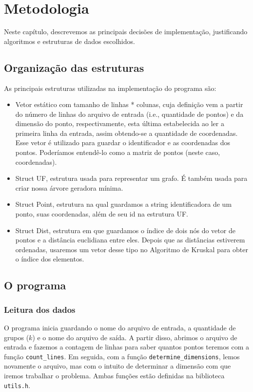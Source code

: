 \chapter{Metodologia}\label{cap-metodologia}

Neste capítulo, descrevemos as principais decisões de implementação, justificando algoritmos e estruturas de dados escolhidos.

\section{Organização das estruturas}\label{sec-organizacao}
As principais estruturas utilizadas na implementação do programa são:
\begin{itemize}
  \item Vetor estático com tamanho de linhas * colunas, cuja definição vem a partir do número de linhas do arquivo de entrada (i.e., quantidade de pontos) e da dimensão do ponto, respectivamente, esta última estabelecida ao ler a primeira linha da entrada, assim obtendo-se a quantidade de coordenadas. Esse vetor é utilizado para guardar o identificador e as coordenadas dos pontos. Poderíamos entendê-lo como a matriz de pontos (neste caso, coordenadas).
  \item Struct UF, estrutura usada para representar um grafo. É também usada para criar nossa árvore geradora mínima.  
  \item Struct Point, estrutura na qual guardamos a string identificadora de um ponto, suas coordenadas, além de seu id na estrutura UF.
  \item Struct Dist, estrutura em que guardamos o índice de dois nós do vetor de pontos e a distância euclidiana entre eles. Depois que as distâncias estiverem ordenadas, usaremos um vetor desse tipo no Algoritmo de Kruskal para obter o índice dos elementos.

\end{itemize}

\section{O programa}
\subsection{Leitura dos dados}
O programa inicia guardando o nome do arquivo de entrada, a quantidade de grupos ($k$) e o nome do arquivo de saída. A partir disso, abrimos o arquivo de entrada e fazemos a contagem de linhas para saber quantos pontos teremos com a função \texttt{count\_lines}. Em seguida, com a função \texttt{determine\_dimensions}, lemos novamente o arquivo, mas com o intuito de determinar a dimensão com que iremos trabalhar o problema. Ambas funções estão definidas na biblioteca \texttt{utils.h}.

